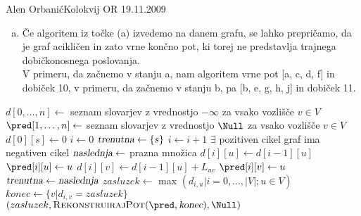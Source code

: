 \begin{naloga}{Alen Orbanić}{Kolokvij OR 19.11.2009}
\begin{odgovor}
\begin{enumerate}[(a)]
Ker gre za izpeljavo Floyd- Warshallovega algoritma, je časovna zahtevnost
enaka $o(n^3)$, kjer je $n$ število vozlišč.

\item Če algoritem iz točke (a) izvedemo na danem grafu, se lahko prepričamo, 
da je graf acikličen in zato vrne končno pot, ki torej ne predstavlja trajnega
dobičkonosnega poslovanja.  \\
V primeru, da začnemo v stanju a, nam algoritem vrne pot [a, c, d, f] in 
dobiček 10, v primeru, da začnemo v stanju b, pa [b, e, g, h, j] in 
dobiček 11.

\end{enumerate}
\begin{slika}
\end{slika}

\begin{slika}
\end{slika}
    
\newpage
\begin{small}
\begin{algorithmic}
    \State $d[0, \dots, n] \gets$ seznam slovarjev z vrednostjo $-\infty$ za vsako vozlišče $v \in V$
    \State $\pred[1, \dots, n] \gets$ seznam slovarjev z vrednostjo $\Null$
    za vsako vozlišče $v \in V$
    \State $d[0][s] \gets 0$
    \State $i \gets 0$
    \State $\text{\sl trenutna} \gets \{s\}$
        \State $i \gets i+1$
         \hfill $\exists$ pozitiven cikel
            \State \Return graf ima negativen cikel 
        \EndIf
        \State $\text{\sl{naslednja}} \gets$ prazna množica
            \State $d[i][u] \gets d[i-1][u]$
            \State $\pred[i][u] \gets u$
        \EndFor
                \State $d[i][v] \gets d[i-1][u] +  L_{uv}$
                \State $\pred[i][v] \gets u$
            \EndIf
        \EndFor
        \State $\text{\sl{trenutna}} \gets \text{\sl{naslednja}}$
    \EndWhile
    \State $zasluzek \gets$ max $({d_{i,u} |i=0, \ldots , |V|;  u \in V})$
    \State $konec \gets \{v | d_{i,v}= zasluzek \}$
    \State \Return $(zasluzek, \text{\sc RekonstruirajPot}(\pred, \text{\sl konec}), \Null)$
\EndFunction
\end{algorithmic}
\end{small}


\end{odgovor}
\end{naloga}
